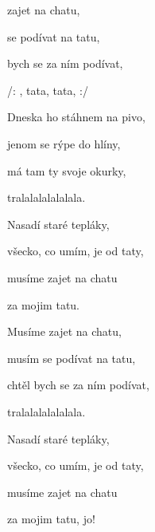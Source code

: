 
\zs
{} zajet na chatu,

 se podívat na tatu,

 bych se za ním podívat,


      

\ks
\zr

/: , tata,  tata,  :/

\kr
\zs
Dneska ho stáhnem na pivo,

jenom se rýpe do hlíny,

má tam ty svoje okurky,

tralalalalalalala.

\ks
\zs

Nasadí staré tepláky,

všecko, co umím, je od taty,

musíme zajet na chatu

za mojim tatu.

\ks
\zs

Musíme zajet na chatu,

musím se podívat na tatu,

chtěl bych se za ním podívat,

tralalalalalalala.

\ks
\zs

Nasadí staré tepláky,

všecko, co umím, je od taty,

musíme zajet na chatu

za mojim tatu, jo!

\ks
\zr

\kr
\kp
